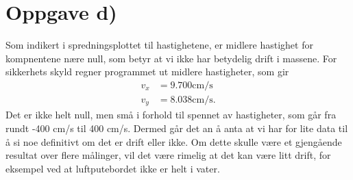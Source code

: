 \documentclass[a4paper, 11pt]{article}
\begin{document}
\section*{Oppgave d)}
Som indikert i spredningsplottet til hastighetene, er midlere hastighet for kompnentene nære null, som betyr at vi ikke har betydelig drift i massene.
For sikkerhets skyld regner programmet ut midlere hastigheter, som gir
\begin{align*}
  v_x &= 9.700 \text{cm/s} \\
  v_y &= 8.038 \text{cm/s}.
\end{align*}
Det er ikke helt null, men små i forhold til spennet av hastigheter, som går fra rundt -400 cm/s til 400 cm/s. Dermed går det an å anta at vi har for lite data til å si noe definitivt om det er drift eller ikke. Om dette skulle være et gjengående resultat over flere målinger, vil det være rimelig at det kan være litt drift, for eksempel ved at luftputebordet ikke er helt i vater.
\end{document}

